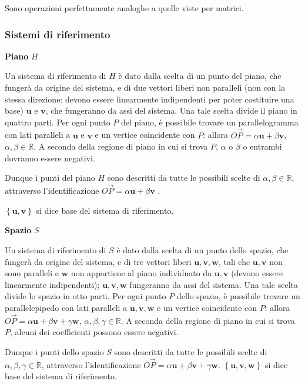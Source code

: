 \documentclass{article}
\begin{document}
Sono operazioni perfettamente analoghe a quelle viste per matrici.

\subsubsection{Sistemi di riferimento}

\textbf{Piano }$H$

Un sistema di riferimento di $H$ \`{e} dato dalla scelta di un punto del
piano, che funger\`{a} da origine del sistema, e di due vettori liberi non
paralleli (non con la stessa direzione: devono essere linearmente
indipendenti per poter costituire una base) $\mathbf{u}$ e $\mathbf{v}$, che
fungeranno da assi del sistema. Una tale scelta divide il piano in quattro
parti. Per ogni punto $P$ del piano, \`{e} possibile trovare un
parallelogramma con lati paralleli a $\mathbf{u}$ e $\mathbf{v}$ e un
vertice coincidente con $P$: allora $O\vec{P}=\alpha \mathbf{u}+\beta 
\mathbf{v}$, $\alpha ,\beta \in 
\mathbb{R}
$. A seconda della regione di piano in cui si trova $P$, $\alpha $ o $\beta $
o entrambi dovranno essere negativi.

Dunque i punti del piano $H$ sono descritti da tutte le possibili scelte di $%
\alpha ,\beta \in 
\mathbb{R}
$, attraverso l'identificazione $O\vec{P}=\alpha \mathbf{u}+\beta \mathbf{v}$%
.

$\left\{ \mathbf{u,v}\right\} $ si dice base del sistema di riferimento.

\textbf{Spazio }$S$

Un sistema di riferimento di $S$ \`{e} dato dalla scelta di un punto dello
spazio, che funger\`{a} da origine del sistema, e di tre vettori liberi $%
\mathbf{u},\mathbf{v,w}$, tali che $\mathbf{u,v}$ non sono paralleli e $%
\mathbf{w}$ non appartiene al piano individuato da $\mathbf{u,v}$ (devono
essere linearmente indipendenti); $\mathbf{u,v,w}$ fungeranno da assi del
sistema. Una tale scelta divide lo spazio in otto parti. Per ogni punto $P$
dello spazio, \`{e} possibile trovare un parallelepipedo con lati paralleli
a $\mathbf{u,v},\mathbf{w}$ e un vertice coincidente con $P$: allora $O\vec{P%
}=\alpha \mathbf{u}+\beta \mathbf{v+}\gamma \mathbf{w}$, $\alpha ,\beta
,\gamma \in 
\mathbb{R}
$. A seconda della regione di piano in cui si trova $P$, alcuni dei
coefficienti possono essere negativi.

Dunque i punti dello spazio $S$ sono descritti da tutte le possibili scelte
di $\alpha ,\beta ,\gamma \in 
\mathbb{R}
$, attraverso l'identificazione $O\vec{P}=\alpha \mathbf{u}+\beta \mathbf{v+}%
\gamma \mathbf{w}$. $\left\{ \mathbf{u,v,w}\right\} $ si dice base del
sistema di riferimento.
\end{document}
